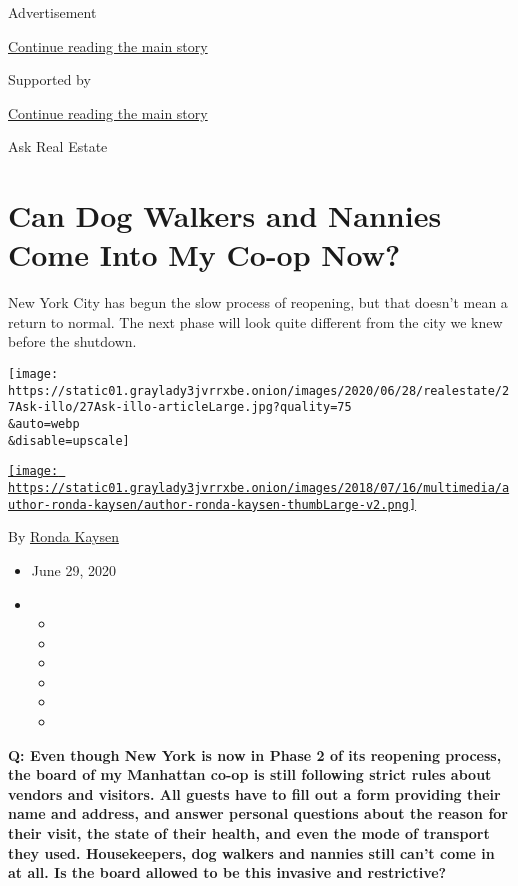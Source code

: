 Advertisement

\protect\hyperlink{after-top}{Continue reading the main story}

Supported by

\protect\hyperlink{after-sponsor}{Continue reading the main story}

Ask Real Estate

\hypertarget{can-dog-walkers-and-nannies-come-into-my-co-op-now}{%
\section{Can Dog Walkers and Nannies Come Into My Co-op
Now?}\label{can-dog-walkers-and-nannies-come-into-my-co-op-now}}

New York City has begun the slow process of reopening, but that doesn't
mean a return to normal. The next phase will look quite different from
the city we knew before the shutdown.

\texttt{[image: https://static01.graylady3jvrrxbe.onion/images/2020/06/28/realestate/27Ask-illo/27Ask-illo-articleLarge.jpg?quality=75\\\&auto=webp\\\&disable=upscale]}

\href{https://www.nytimes3xbfgragh.onion/by/ronda-kaysen}{\texttt{[image: https://static01.graylady3jvrrxbe.onion/images/2018/07/16/multimedia/author-ronda-kaysen/author-ronda-kaysen-thumbLarge-v2.png]}}

By \href{https://www.nytimes3xbfgragh.onion/by/ronda-kaysen}{Ronda
Kaysen}

\begin{itemize}
\item
  June 29, 2020
\item
  \begin{itemize}
  \item
  \item
  \item
  \item
  \item
  \item
  \end{itemize}
\end{itemize}

\textbf{Q: Even though New York is now in Phase 2 of its reopening
process, the board of my Manhattan co-op is still following strict rules
about vendors and visitors. All guests have to fill out a form providing
their name and address, and answer personal questions about the reason
for their visit, the state of their health, and even the mode of
transport they used. Housekeepers, dog walkers and nannies still can't
come in at all. Is the board allowed to be this invasive and
restrictive?}

